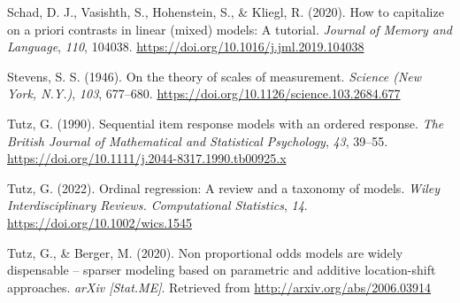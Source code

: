 \documentclass[
  man,floatsintext]{apa6}
\newlength{\cslhangindent}
\newenvironment{CSLReferences}[2] %
 {\begin{list}{}{%
  \setlength{\itemindent}{0pt}
  \setlength{\leftmargin}{0pt}
  \setlength{\parsep}{0pt}
  \ifodd #1
   \setlength{\leftmargin}{\cslhangindent}
   \setlength{\itemindent}{-1\cslhangindent}
  \fi
  \setlength{\itemsep}{#2\baselineskip}}}
 {\end{list}}
\begin{document}
\begin{CSLReferences}{1}{0}
Schad, D. J., Vasishth, S., Hohenstein, S., \& Kliegl, R. (2020). How to capitalize on a priori contrasts in linear (mixed) models: A tutorial. \emph{Journal of Memory and Language}, \emph{110}, 104038. \url{https://doi.org/10.1016/j.jml.2019.104038}

Stevens, S. S. (1946). On the theory of scales of measurement. \emph{Science (New York, N.Y.)}, \emph{103}, 677--680. \url{https://doi.org/10.1126/science.103.2684.677}

Tutz, G. (1990). Sequential item response models with an ordered response. \emph{The British Journal of Mathematical and Statistical Psychology}, \emph{43}, 39--55. \url{https://doi.org/10.1111/j.2044-8317.1990.tb00925.x}

Tutz, G. (2022). Ordinal regression: A review and a taxonomy of models. \emph{Wiley Interdisciplinary Reviews. Computational Statistics}, \emph{14}. \url{https://doi.org/10.1002/wics.1545}

Tutz, G., \& Berger, M. (2020). Non proportional odds models are widely dispensable -- sparser modeling based on parametric and additive location-shift approaches. \emph{arXiv {[}Stat.ME{]}}. Retrieved from \url{http://arxiv.org/abs/2006.03914}

\end{CSLReferences}
\end{document}
